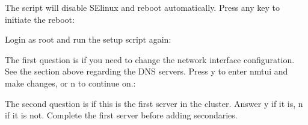 \documentclass[letterpaper,10pt,english]{sphinxmanual}
\begin{document}
The script will disable SElinux and reboot automatically. Press any key to initiate the reboot:

\begin{sphinxVerbatim}[commandchars=\\\{\}]
 
      
                    
       
\end{sphinxVerbatim}

Login as root and run the setup script again:

\begin{sphinxVerbatim}[commandchars=\\\{\}]
\end{sphinxVerbatim}

The first question is if you need to change the network interface configuration. See the {\hyperref[\detokenize{setupscript:setup-preparation}]{}} section above regarding the DNS servers. Press y to enter nmtui and make changes, or n to continue on.:

\begin{sphinxVerbatim}[commandchars=\\\{\}]
    
 
     
      \PYG{l+s+s1}{s  network settings? [ enter }\PYG{l+s+s1}{ ] :}
\end{sphinxVerbatim}

The second question is if this is the first server in the cluster. Answer y if it is, n if it is not. Complete the first server before adding secondaries.
\end{document}
